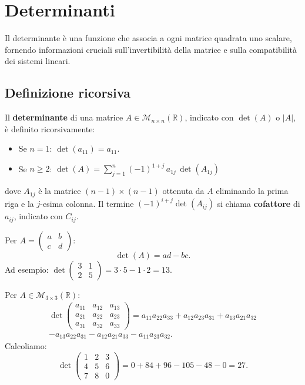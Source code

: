 \chapter{Determinanti}
\label{ch:determinanti}

Il determinante è una funzione che associa a ogni matrice quadrata uno scalare, fornendo informazioni cruciali sull'invertibilità della matrice e sulla compatibilità dei sistemi lineari.

\section{Definizione ricorsiva}
\label{sec:det-definizione}

\begin{definitionbox}[Determinante]
Il \textbf{determinante} di una matrice $A \in \mathcal{M}_{n \times n}(\mathbb{R})$, indicato con $\det(A)$ o $|A|$, è definito ricorsivamente:
\begin{itemize}
    \item Se $n = 1$: $\det(a_{11}) = a_{11}$.
    \item Se $n \geq 2$: $\displaystyle \det(A) = \sum_{j=1}^{n} (-1)^{1+j} \, a_{1j} \, \det(A_{1j})$
\end{itemize}
dove $A_{1j}$ è la matrice $(n-1) \times (n-1)$ ottenuta da $A$ eliminando la prima riga e la $j$-esima colonna. Il termine $(-1)^{i+j} \det(A_{ij})$ si chiama \textbf{cofattore} di $a_{ij}$, indicato con $C_{ij}$.
\end{definitionbox}

\begin{examplebox}
Per $A = \begin{pmatrix} a & b \\ c & d \end{pmatrix}$:
\[ \det(A) = ad - bc. \]
Ad esempio: $\det\begin{pmatrix} 3 & 1 \\ 2 & 5 \end{pmatrix} = 3 \cdot 5 - 1 \cdot 2 = 13$.
\end{examplebox}

\begin{examplebox}
Per $A \in \mathcal{M}_{3 \times 3}(\mathbb{R})$:
\begin{multline*}
\det\begin{pmatrix} a_{11} & a_{12} & a_{13} \\ a_{21} & a_{22} & a_{23} \\ a_{31} & a_{32} & a_{33} \end{pmatrix} = a_{11}a_{22}a_{33} + a_{12}a_{23}a_{31} + a_{13}a_{21}a_{32} \\
- a_{13}a_{22}a_{31} - a_{12}a_{21}a_{33} - a_{11}a_{23}a_{32}.
\end{multline*}
Calcoliamo:
\[ \det\begin{pmatrix} 1 & 2 & 3 \\ 4 & 5 & 6 \\ 7 & 8 & 0 \end{pmatrix} = 0 + 84 + 96 - 105 - 48 - 0 = 27. \]
\end{examplebox}

